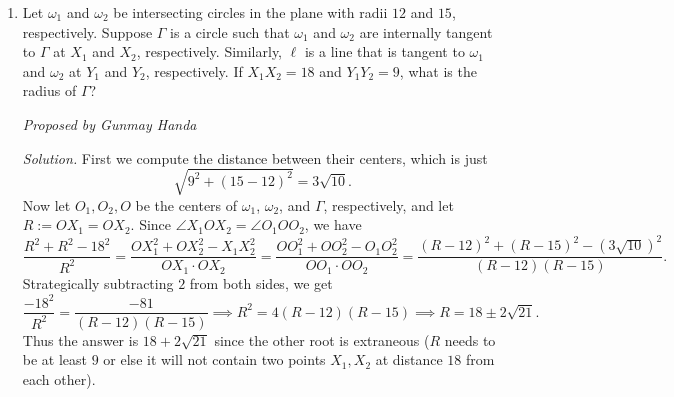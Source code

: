 \documentclass[10pt]{article}
\newcommand{\proposed}[1]
{
\vspace{5pt}
\noindent\textit{Proposed by #1}
}
\newcommand{\solution}
{
\vspace{5pt}
\noindent\textit{Solution.}\qquad
}
\begin{document}
\begin{enumerate}
\solution Let $M$ be the midpoint of $\overline{T_1T_3}$.  We claim that $X$ is the reflection $M'$ of $M$ across $T_2$.  To prove this, first remark that \[\frac{XT_1}{XT_3} = \frac{[T_1T_2T_0]}{[T_2T_3T_0]} = \frac{\frac12(T_1T_2)(T_2T_0)}{\frac12(T_2T_3)(T_2T_0)} = \frac{T_1T_2}{T_3T_2} = 1.\] Thus $XT_1 = XT_3$; since $X$ lies in the plane $T_1T_2T_3$, $X$ must lie on the perpendicular bisector of $\overline{T_1T_3}$.  Now applying similar logic on the points $T_2$ and $T_0$ yields \[\frac{XT_2}{XT_0} = \frac{[T_1T_2T_3]}{[T_1T_3T_0]} = \frac{T_2M}{T_0M}.\] Now remark that as $X$ moves farther away from $T_2$, the ratio $\frac{XT_2}{XT_0}$ gets closer to $1$ (without ever equalling one).  Thus, either $X\equiv M$ or $X\equiv M'$.  To show it is not $M$, suppose it were, and write \[\frac{MT_1}{MT_0} = \frac{[T_1T_2T_3]}{[T_2T_3T_0]} = \frac{T_2T_1}{T_2T_0}.\qquad(*)\]  But this is not possible, since $MT_1 < T_2T_1$ and $MT_0 > T_2T_0$.  Thus the only possible option is $T\equiv M'$ as desired.

\par Now let $z$ be the $z$-coordinate of $T_0$.  Using $(*)$ but with $M'$ in place of $M$ gives \[\frac{1}{z} = \frac{T_2T_1}{T_2T_0} = \frac{M'T_1}{M'T_0} = \frac{\sqrt{5/2}}{\sqrt{1/2 + z^2}} = \sqrt{\frac{5}{1+2z^2}};\] solving this equation yields $z = \boxed{\tfrac{\sqrt 3}3}$.

\item Let $\omega_1$ and $\omega_2$ be intersecting circles in the plane with radii $12$ and $15$, respectively. Suppose $\Gamma$ is a circle such that $\omega_1$ and $\omega_2$ are internally tangent to $\Gamma$ at $X_1$ and $X_2$, respectively. Similarly, $\ell$ is a line that is tangent to $\omega_1$ and $\omega_2$ at $Y_1$ and $Y_2$, respectively. If $X_1X_2=18$ and $Y_1Y_2=9$, what is the radius of $\Gamma$?

\proposed{Gunmay Handa}

\solution First we compute the distance between their centers, which is just \[\sqrt{9^2+(15-12)^2}=3\sqrt{10}.\] Now let $O_1,O_2,O$ be the centers of $\omega_1$, $\omega_2$, and $\Gamma$, respectively, and let $R:=OX_1=OX_2$. Since $\angle X_1OX_2=\angle O_1OO_2$, we have \[\frac{R^2+R^2-18^2}{R^2}=\frac{OX_1^2+OX_2^2-X_1X_2^2}{OX_1\cdot OX_2}=\frac{OO_1^2+OO_2^2-O_1O_2^2}{OO_1\cdot OO_2}=\frac{(R-12)^2+(R-15)^2-(3\sqrt{10})^2}{(R-12)(R-15)}.\] Strategically subtracting $2$ from both sides, we get \[\frac{-18^2}{R^2}=\frac{-81}{(R-12)(R-15)}\implies R^2=4(R-12)(R-15)\implies R=18\pm2\sqrt{21}.\] Thus the answer is $\boxed{18+2\sqrt{21}}$ since the other root is extraneous ($R$ needs to be at least $9$ or else it will not contain two points $X_1,X_2$ at distance $18$ from each other).


\end{enumerate}
\end{document}
